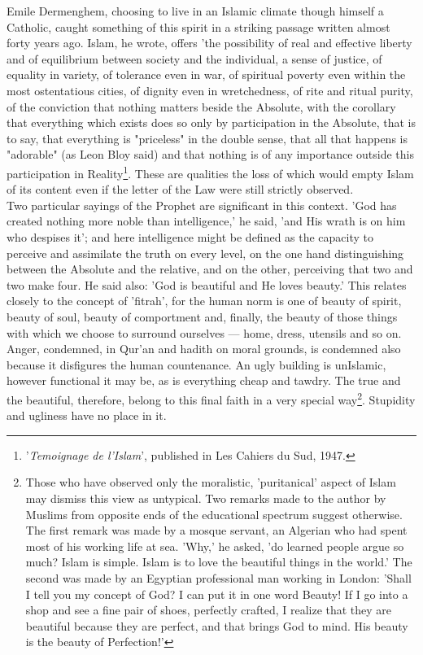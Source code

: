 \documentclass[11pt, b5paper, twoside]{book}
\begin{document}
Emile Dermenghem, choosing to live in an Islamic climate though himself a Catholic, caught something 
of this spirit in a striking passage written almost forty years ago. Islam, he wrote, offers 'the 
possibility of real and effective liberty and of equilibrium between society and the individual, a 
sense of justice, of equality in variety, of tolerance even in war, of spiritual poverty even within 
the most ostentatious cities, of dignity even in wretchedness, of rite and ritual purity, of the 
conviction that nothing matters beside the Absolute, with the corollary that everything which exists 
does so only by participation in the Absolute, that is to say, that everything is "priceless" in the 
double sense, that all that happens is "adorable" (as Leon Bloy said) and that nothing is of any 
importance outside this participation in Reality\footnote{'\emph{Temoignage de l'Islam}', published in Les Cahiers du Sud, 1947.}. These are qualities the loss of which would empty Islam of its content even if the letter of the Law were still strictly observed. \\

Two particular sayings of the Prophet are significant in this context. 'God has created nothing more 
noble than intelligence,' he said, 'and His wrath is on him who despises it'; and here intelligence 
might be defined as the capacity to perceive and assimilate the truth on every level, on the one hand 
distinguishing between the Absolute and the relative, and on the other, perceiving that two and two 
make four. He said also: 'God is beautiful and He loves beauty.' This relates closely to the concept 
of 'fitrah', for the human norm is one of beauty of spirit, beauty of soul, beauty of comportment 
and, finally, the beauty of those things with which we choose to surround ourselves --- home, dress, 
utensils and so on. Anger, condemned, in Qur'an and hadith on moral grounds, is condemned also 
because it disfigures the human countenance. An ugly building is unIslamic, however functional it may 
be, as is everything cheap and tawdry. The true and the beautiful, therefore, belong to this final 
faith in a very special way\footnote{Those who have observed only the moralistic, 'puritanical' aspect of Islam may dismiss this view as untypical. Two remarks made to the author by Muslims from opposite ends of the educational spectrum suggest otherwise. The first remark was made by a mosque servant, an Algerian who had spent most of his working life at sea. 'Why,' he asked, 'do learned people argue so much? Islam is simple. Islam is to love the beautiful things in the world.' The second was made by an Egyptian professional man working in London: 'Shall I tell you my concept of God? I can put it in one word Beauty! If I go into a shop and see a fine pair of shoes, perfectly crafted, I realize that they are beautiful because they are perfect, and that brings God to mind. His beauty is the beauty of Perfection!'}. Stupidity and ugliness have no place in it. \\
\end{document}
